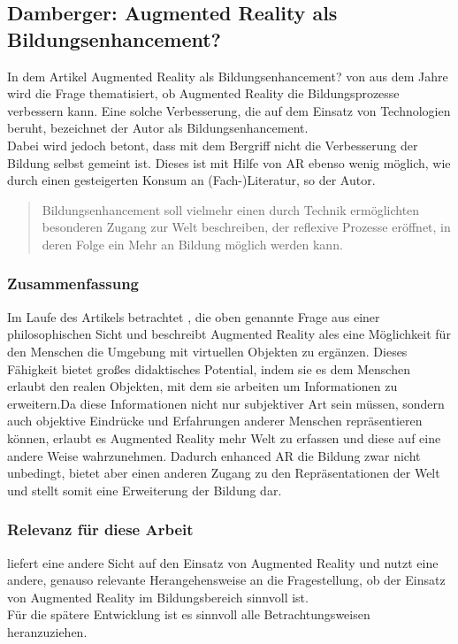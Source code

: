 \subsection{Damberger: Augmented Reality als Bildungsenhancement?}
In dem Artikel \glqq Augmented Reality als Bildungsenhancement?\grqq{} von \citeauthor{damberger:ar-bildungsenhancement} aus dem Jahre \citeyear{damberger:ar-bildungsenhancement} wird die Frage thematisiert, ob Augmented Reality die Bildungsprozesse verbessern kann. Eine solche Verbesserung, die auf dem Einsatz von Technologien beruht, bezeichnet der Autor als Bildungsenhancement. \\
Dabei wird jedoch betont, dass mit dem Bergriff nicht die Verbesserung der Bildung selbst gemeint ist. Dieses ist mit Hilfe von AR ebenso wenig möglich, wie durch einen gesteigerten Konsum an (Fach-)Literatur, so der Autor.
\begin{quote}
\glqq Bildungsenhancement soll vielmehr einen durch Technik ermöglichten besonderen Zugang zur Welt beschreiben, der reflexive Prozesse eröffnet, in deren Folge ein Mehr an Bildung möglich werden kann.\grqq{} \citep[S. 5]{damberger:ar-bildungsenhancement}
\end{quote}


\subsubsection{Zusammenfassung}
Im Laufe des Artikels betrachtet \citeauthor{damberger:ar-bildungsenhancement}, die oben genannte Frage aus einer philosophischen Sicht und beschreibt Augmented Reality ales eine Möglichkeit für den Menschen die Umgebung mit virtuellen Objekten zu ergänzen. Dieses Fähigkeit bietet großes didaktisches Potential, indem sie es dem Menschen erlaubt den realen Objekten, mit dem sie arbeiten um Informationen zu erweitern.Da diese Informationen nicht nur subjektiver Art sein müssen, sondern auch objektive Eindrücke und Erfahrungen anderer Menschen repräsentieren können, erlaubt es Augmented Reality mehr Welt zu erfassen und diese auf eine andere Weise wahrzunehmen. Dadurch \glqq enhanced\grqq{} AR die Bildung zwar nicht unbedingt, bietet aber einen anderen Zugang zu den Repräsentationen der Welt und stellt somit eine Erweiterung der Bildung dar. \citep[S. 22-23]{damberger:ar-bildungsenhancement}

\subsubsection{Relevanz für diese Arbeit}
\citeauthor{damberger:ar-bildungsenhancement} liefert eine andere Sicht auf den Einsatz von Augmented Reality und nutzt eine andere, genauso relevante Herangehensweise an die Fragestellung, ob der Einsatz von Augmented Reality im Bildungsbereich sinnvoll ist.\\
Für die spätere Entwicklung ist es sinnvoll alle Betrachtungsweisen heranzuziehen.


